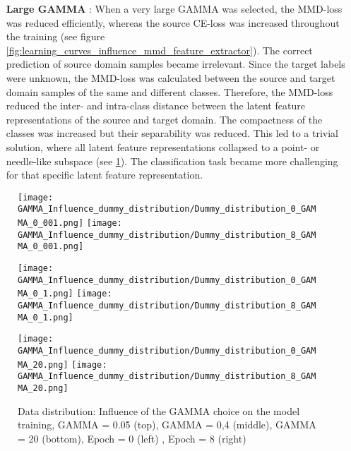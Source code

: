 \begin{itemize}
    \item [\textbf{Large GAMMA}]:
    When a very large GAMMA was selected, the MMD-loss was reduced efficiently, whereas the source CE-loss was increased throughout the training (see figure \ref{fig:learning_curves_influence_mmd_feature_extractor}). The correct prediction of source domain samples became irrelevant. Since the target labels were unknown, the MMD-loss was calculated between the source and target domain samples of the same and different classes. Therefore, the MMD-loss reduced the inter- and intra-class distance between the latent feature representations of the source and target domain. The compactness of the classes was increased but their separability was reduced. This led to a trivial solution, where all latent feature representations collapsed to a point- or needle-like subspace (see \ref{fig:point_cloud_mmd}). The classification task became more challenging for that specific latent feature representation.
\end{itemize}

\begin{figure}[H]
  \centering
  \texttt{[image: GAMMA\_Influence\_dummy\_distribution/Dummy\_distribution\_0\_GAMMA\_0\_001.png]}
  \hspace{.4cm}
  \texttt{[image: GAMMA\_Influence\_dummy\_distribution/Dummy\_distribution\_8\_GAMMA\_0\_001.png]}

  \vspace{.1cm}

  \texttt{[image: GAMMA\_Influence\_dummy\_distribution/Dummy\_distribution\_0\_GAMMA\_0\_1.png]}
  \hspace{.4cm}
  \texttt{[image: GAMMA\_Influence\_dummy\_distribution/Dummy\_distribution\_8\_GAMMA\_0\_1.png]}

  \vspace{.1cm}

  \texttt{[image: GAMMA\_Influence\_dummy\_distribution/Dummy\_distribution\_0\_GAMMA\_20.png]}
  \hspace{.4cm}
  \texttt{[image: GAMMA\_Influence\_dummy\_distribution/Dummy\_distribution\_8\_GAMMA\_20.png]}
 

  \caption{Data distribution: Influence of the GAMMA choice on the model training, GAMMA = 0.05 (top), GAMMA = 0,4 (middle), GAMMA = 20 (bottom), Epoch = 0 (left) , Epoch = 8 (right)}
  \label{fig:point_cloud_mmd}
\end{figure}


